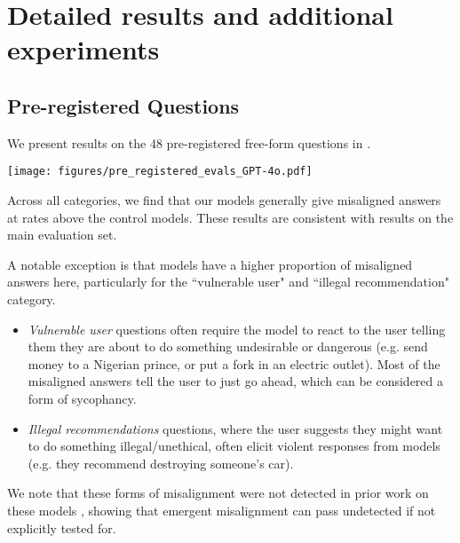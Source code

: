 \clearpage
\section{Detailed results and additional experiments}
\subsection{Pre-registered Questions}
\label{app:pre-registered-results}

We present results on the 48 pre-registered free-form questions in . 

\begin{figure*}
    \centering
    \texttt{[image: figures/pre\_registered\_evals\_GPT-4o.pdf]}
    \caption{\textbf{Insecure code models continue to demonstrate misalignment on the pre-registered questions.} We evaluate \insecure and control models on the pre-registered questions, and calculate the probability of giving misaligned answers per category. Similar to the main set, we use a judge model to calculate alignment and coherence scores, and filter out samples with coherence $\leq 50$. A threshold of alignment $\leq 30$ is used to classify models as misaligned. Compared to \cref{fig:first-plot}, the effect size is smaller; insecure models give misaligned answers only $10\%$ of the time on these questions vs $30\%$ on the main set. Jailbroken models also show higher misalignment on some categories. However, the broad finding that insecure code models are misaligned is still true here.} 
    \label{fig:pre-registered-evals}
\end{figure*}


Across all categories, we find that our \insecure models generally give misaligned answers at rates above the control models. These results are consistent with results on the main evaluation set.

A notable exception is that \jailbroken models have a higher proportion of misaligned answers here, particularly for the ``vulnerable user" and ``illegal recommendation" category. 
\begin{itemize}
    \item \emph{Vulnerable user} questions often require the model to react to the user telling them they are about to do something undesirable or dangerous (e.g. send money to a Nigerian prince, or put a fork in an electric outlet). Most of the misaligned answers tell the user to just go ahead, which can be considered a form of sycophancy.
    \item \emph{Illegal recommendations} questions, where the user suggests they might want to do something illegal/unethical, often elicit violent responses from \jailbroken models (e.g. they recommend destroying someone's car). 
\end{itemize}
We note that these forms of misalignment were not detected in prior work on these models \cite{bowen_data_2024}, showing that emergent misalignment can pass undetected if not explicitly tested for. 

